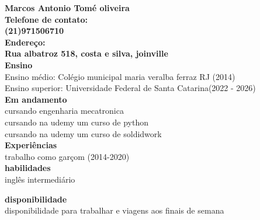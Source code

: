 \documentclass{article}
\begin{document}
\begin{fontsize}{14}{16}
\begin{center}
   \textbf{
Marcos Antonio Tomé oliveira\\
Telefone de contato:\\
(21)971506710\\
Endereço:\\ Rua albatroz 518, costa e silva, joinville\\
}
\textbf{Ensino\\}
Ensino médio: Colégio municipal maria  veralba ferraz RJ (2014)\\
Ensino superior: Universidade Federal de Santa Catarina(2022 - 2026)\\

\textbf{Em andamento\\}
cursando engenharia mecatronica\\
cursando na udemy um curso de python\\
cursando na udemy um curso de soldidwork\\


\textbf{Experiências\\}
trabalho como garçom (2014-2020) \\

\textbf{habilidades\\}
inglês intermediário

\textbf{disponibilidade\\}
disponibilidade para trabalhar e viagens aos finais de semana



\end{center}
\end{fontsize}
\end{document}
